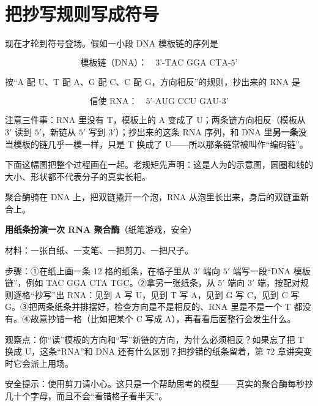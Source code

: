 \section{把抄写规则写成符号}

现在才轮到符号登场。假如一小段 DNA 模板链的序列是

\[ \text{模板链（DNA）：}\quad \text{3'-TAC GGA CTA-5'} \]

按“A 配 U、T 配 A、G 配 C、C 配 G，方向相反”的规则，抄出来的 RNA 是

\[ \text{信使 RNA：}\quad \text{5'-AUG CCU GAU-3'} \]

注意三件事：RNA 里没有 T，模板上的 A 变成了 U；两条链方向相反（模板从 $3'$ 读到 $5'$，新链从 $5'$ 写到 $3'$）；抄出来的这条 RNA 序列，和 DNA 里\textbf{另一条}没当模板的链几乎一模一样，只是 T 换成了 U——所以那条链常被叫作“编码链”。

下面这幅图把整个过程画在一起。老规矩先声明：这是人为的示意图，圆圈和线的大小、形状都不代表分子的真实长相。

\begin{center}
\end{center}

聚合酶骑在 DNA 上，把双链撬开一个泡，RNA 从泡里长出来，身后的双链重新合上。

\begin{shiyan}
\textbf{用纸条扮演一次 RNA 聚合酶}（纸笔游戏，安全）

材料：一张白纸、一支笔、一把剪刀、一把尺子。

步骤：①在纸上画一条 12 格的纸条，在格子里从 $3'$ 端向 $5'$ 端写一段“DNA 模板链”，例如 TAC GGA CTA TGC。②拿另一张纸条，从 $5'$ 端向 $3'$ 端，按配对规则逐格“抄写”出 RNA：见到 A 写 U，见到 T 写 A，见到 G 写 C，见到 C 写 G。③把两条纸条并排摆好，检查方向是不是相反的、RNA 里是不是一个 T 都没有。④故意抄错一格（比如把某个 C 写成 A），再看看后面整行会发生什么。

观察点：你“读”模板的方向和“写”新链的方向，为什么必须相反？如果忘了把 T 换成 U，这条“RNA”和 DNA 还有什么区别？把抄错的纸条留着，第 72 章讲突变时它会派上用场。

安全提示：使用剪刀请小心。这只是一个帮助思考的模型——真实的聚合酶每秒抄几十个字母，而且不会“看错格子看半天”。
\end{shiyan}


